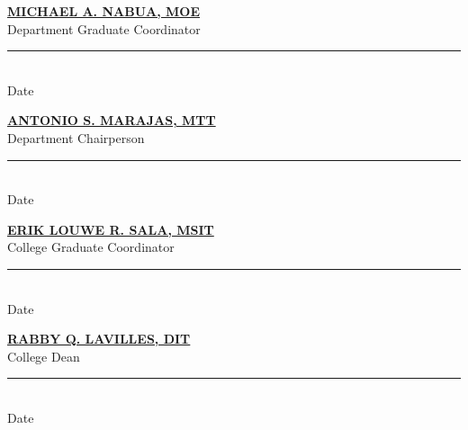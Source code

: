 \vspace{0.2cm}
\begin{center}
	\begin{minipage}{0.48\textwidth}
		\begin{center}
			\textbf{\underline{\MakeUppercase{Michael A. Nabua}, MOE}}\\ [-0.5\baselineskip]
			Department Graduate Coordinator\\
			\rule{2.5cm}{0.25pt}\\ [-0.5\baselineskip]
			\hspace{0.5cm} %
			Date
		\end{center}
	\end{minipage}
	\hfill
	\begin{minipage}{0.48\textwidth}
		\begin{center}
			\textbf{\underline{\MakeUppercase{Antonio S. Marajas}, MTT}}\\ [-0.5\baselineskip]
			Department Chairperson\\
			\rule{2.5cm}{0.25pt}\\ [-0.5\baselineskip]
			\hspace{0.5cm} %
			Date
		\end{center}
	\end{minipage}
\end{center}


\begin{center}
	\begin{minipage}{0.53\textwidth}
		\begin{center}
			\textbf{\underline{\MakeUppercase{Erik Louwe R. Sala}, MSIT}}\\ [-0.5\baselineskip]
			College Graduate Coordinator\\
			\rule{2.5cm}{0.25pt}\\ [-0.5\baselineskip]
			\hspace{0.5cm} %
			Date
		\end{center}
	\end{minipage}
	\hfill
	\begin{minipage}{0.45\textwidth}
		\begin{center}
			\textbf{\underline{\MakeUppercase{Rabby Q. Lavilles}, DIT}}\\ [-0.5\baselineskip]
			College Dean\\
			\rule{2.5cm}{0.25pt}\\ [-0.5\baselineskip]
			\hspace{0.5cm} %
			Date
		\end{center}
	\end{minipage}
\end{center}